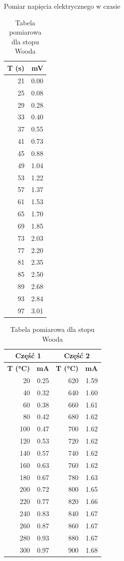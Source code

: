 \documentclass[11pt]{article}
\begin{document}
\begin{table}[ht]
\centering
\footnotesize
\setlength{\tabcolsep}{4pt}
\renewcommand{\arraystretch}{0.8}
\begin{minipage}[t]{0.45\textwidth}
\caption{Pomiar napięcia elektrycznego w czasie}
\label{tab:method1}
\begin{tabular}{|r|r|}
\hline
\textbf{T (s)} & \textbf{mV} \\
\hline
21 & 0.00 \\
25 & 0.08 \\
29 & 0.28 \\
33 & 0.40 \\
37 & 0.55 \\
41 & 0.73 \\
45 & 0.88 \\
49 & 1.04 \\
53 & 1.22 \\
57 & 1.37 \\
61 & 1.53 \\
65 & 1.70 \\
69 & 1.85 \\
73 & 2.03 \\
77 & 2.20 \\
81 & 2.35 \\
85 & 2.50 \\
89 & 2.68 \\
93 & 2.84 \\
97 & 3.01 \\
\hline
\end{tabular}
\end{minipage}%
\hfill
\begin{minipage}[t]{0.45\textwidth}
\caption{Tabela pomiarowa dla stopu Wooda}
\label{tab:method2}
\begin{tabular}{|r|r||r|r|}
\hline
\multicolumn{2}{|c||}{\textbf{Część 1}} & \multicolumn{2}{c|}{\textbf{Część 2}} \\
\hline
\textbf{T (°C)} & \textbf{mA} & \textbf{T (°C)} & \textbf{mA} \\
\hline
20 & 0.25 & 620 & 1.59 \\
40 & 0.32 & 640 & 1.60 \\
60 & 0.38 & 660 & 1.61 \\
80 & 0.42 & 680 & 1.62 \\
100 & 0.47 & 700 & 1.62 \\
120 & 0.53 & 720 & 1.62 \\
140 & 0.57 & 740 & 1.62 \\
160 & 0.63 & 760 & 1.62 \\
180 & 0.67 & 780 & 1.63 \\
200 & 0.72 & 800 & 1.65 \\
220 & 0.77 & 820 & 1.66 \\
240 & 0.83 & 840 & 1.67 \\
260 & 0.87 & 860 & 1.67 \\
280 & 0.93 & 880 & 1.67 \\
300 & 0.97 & 900 & 1.68 \\
\hline
\end{tabular}
\end{minipage}
\end{table}
\end{document}
